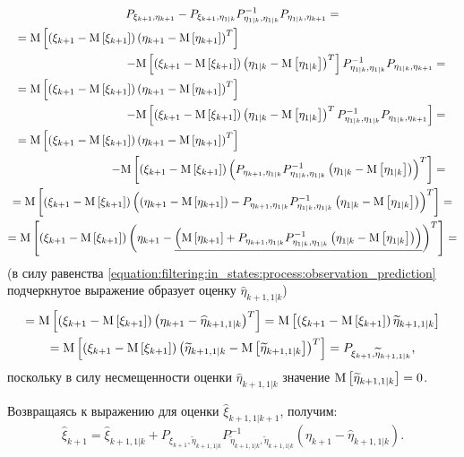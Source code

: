 \begin{multline*}
	P_{\xi_{k+1}, \eta_{k+1}} - P_{\xi_{k+1}, \eta_{1|k}} P_{\eta_{1|k},\eta_{1|k}}^{-1} P_{\eta_{1|k}, \eta_{k+1}} = \\
	\shoveleft{
		= \expectation{\centered{\xi_{k+1}} \centered{\eta_{k+1}}^T}
	} \\
	\shoveright{
		- \expectation{\centered{\xi_{k+1}} \centered{\eta_{1|k}}^T} P_{\eta_{1|k},\eta_{1|k}}^{-1} P_{\eta_{1|k}, \eta_{k+1}} =
	} \\
	\shoveleft{
		= \expectation{\centered{\xi_{k+1}} \centered{\eta_{k+1}}^T}
	} \\
	\shoveright{
		- \expectation{\centered{\xi_{k+1}} \centered{\eta_{1|k}}^T P_{\eta_{1|k},\eta_{1|k}}^{-1} P_{\eta_{1|k}, \eta_{k+1}} }  =
	} \\
	\shoveleft{
		= \expectation{\centered{\xi_{k+1}} \centered{\eta_{k+1}}^T}
	} \\
	\shoveright{
		- \expectation{\centered{\xi_{k+1}} \left ( P_{\eta_{k+1},\eta_{1|k}} P_{\eta_{1|k},\eta_{1|k}}^{-1} \centered{\eta_{1|k}} \right )^T }  =
	} \\
	= \expectation{\centered{\xi_{k+1}} \left ( \centered{\eta_{k+1}} - P_{\eta_{k+1},\eta_{1|k}} P_{\eta_{1|k},\eta_{1|k}}^{-1} \centered{\eta_{1|k}} \right )^T} = \\
	= \expectation{\centered{\xi_{k+1}} \left ( \eta_{k+1} - \underline{\left ( \expectation{\eta_{k+1}} + P_{\eta_{k+1},\eta_{1|k}} P_{\eta_{1|k},\eta_{1|k}}^{-1} \centered{\eta_{1|k}} \right )} \right )^T} = \\
\end{multline*}
(в силу равенства \eqref{equation:filtering:in_states:process:observation_prediction} подчеркнутое выражение образует оценку $\widehat{\eta}_{k+1,1|k}$)
\begin{multline} \label{equation:filtering:in_states:process:next_state_and_innovation_covariance}
	= \mathrm{M} \left [ \left ( \xi_{k+1} - \mathrm{M} \left [ \xi_{k+1} \right ] \right ) \left ( \eta_{k+1} - \widehat{\eta}_{k+1,1|k} \right )^T \right ]
		= \mathrm{M} \left [ \left ( \xi_{k+1} - \mathrm{M} \left [ \xi_{k+1} \right ] \right ) \widetilde{\eta}_{k+1,1|k} \right ] \\
	= \mathrm{M} \left [ \left ( \xi_{k+1} - \mathrm{M} \left [ \xi_{k+1} \right ] \right ) \left ( \widetilde{\eta}_{k+1,1|k} - \mathrm{M} \left [ \widetilde{\eta}_{k+1,1|k} \right ] \right )^T \right ]
		= P_{\xi_{k+1}, \widetilde{\eta}_{k+1,1|k}}
	,
\end{multline}
поскольку в силу несмещенности оценки $\widehat{\eta}_{k+1,1|k}$ значение $\mathrm{M} \left [ \widetilde{\eta}_{k+1,1|k} \right ] = 0$.

Возвращаясь к выражению для оценки $\widehat{\xi}_{k+1,1|k+1}$, получим:
$$
	\widehat{\xi}_{k+1}
		= \widehat{\xi}_{k+1,1|k}
		+ P_{\xi_{k+1}, \widetilde{\eta}_{k+1,1|k}} P_{\widetilde{\eta}_{k+1, 1|k}, \widetilde{\eta}_{k+1, 1|k}}^{-1} \left ( \eta_{k+1} - \widehat{\eta}_{k+1, 1|k} \right )
	.
$$

